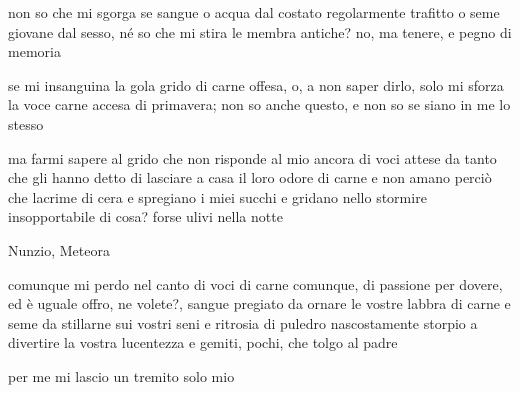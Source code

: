 \clearpage


\begin{poem}
	\begin{stanza}
		non so che mi sgorga\verseline
		se sangue o acqua dal costato\verseline
		regolarmente trafitto\verseline
		o seme giovane dal sesso,\verseline
		né so che mi stira\verseline
		le membra antiche? no,\verseline
		ma tenere, e pegno di memoria
	\end{stanza}

	\begin{stanza}
		se mi insanguina la gola\verseline
		grido di carne offesa,\verseline
		o, a non saper dirlo,\verseline
		solo mi sforza la voce\verseline
		carne accesa di primavera;\verseline
		non so anche questo, e non so\verseline
		se siano in me lo stesso
	\end{stanza}
\end{poem}

\clearpage


\begin{poem}
	\begin{stanza}
		ma farmi sapere al grido\verseline
		che non risponde al mio ancora\verseline
		di voci attese da tanto\verseline
		che gli hanno detto di lasciare\verseline
		a casa il loro odore di carne\verseline
		e non amano perciò che lacrime di cera\verseline
		e spregiano i miei succhi e gridano\verseline
		nello stormire insopportabile\verseline
		di cosa? forse ulivi nella notte
	\end{stanza}
\end{poem}

\clearpage


\begin{artItem}
	Nunzio, Meteora
\end{artItem}

\begin{poem}
	\begin{stanza}
		comunque mi perdo nel canto\verseline
		di voci di carne comunque,\verseline
		di passione per dovere, ed è uguale\verseline
		offro, ne volete?, sangue pregiato\verseline
		da ornare le vostre labbra di carne\verseline
		e seme da stillarne sui vostri seni\verseline
		e ritrosia di puledro nascostamente storpio\verseline
		a divertire la vostra lucentezza\verseline
		e gemiti, pochi, che tolgo al padre
	\end{stanza}

	\begin{stanza}
		per me mi lascio un tremito solo mio
	\end{stanza}
\end{poem}

